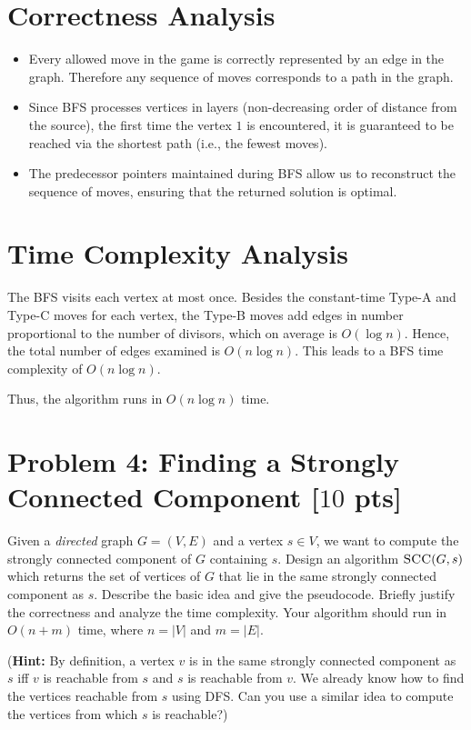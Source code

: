 \documentclass[letterpaper, 11pt]{article}
\newcommand{\1}{\mathds{1}}	%
\theoremstyle{definition}
\newcommand{\problem}[1]{\section*{Problem #1}}
\newenvironment{solution}{{\par\noindent\it Solution.}}{}
\begin{document}
\begin{solution}
\section*{Correctness Analysis}

\begin{itemize}
    \item  Every allowed move in the game is correctly represented by an edge in the graph. Therefore any sequence of moves corresponds to a path in the graph.
    \item  Since BFS processes vertices in layers (non-decreasing order of distance from the source), the first time the vertex \(1\) is encountered, it is guaranteed to be reached via the shortest path (i.e., the fewest moves).
    \item The predecessor pointers maintained during BFS allow us to reconstruct the sequence of moves, ensuring that the returned solution is optimal.
\end{itemize}

\section*{Time Complexity Analysis}

 The BFS visits each vertex at most once. Besides the constant-time Type-A and Type-C moves for each vertex, the Type-B moves add edges in number proportional to the number of divisors, which on average is \(O(\log n)\). Hence, the total number of edges examined is \(O(n \log n)\). This leads to a BFS time complexity of \( O(n \log n) \).


Thus, the algorithm runs in \( O(n \log n) \) time.

\end{solution}
\clearpage

\problem{4: Finding a Strongly Connected Component [$10$ pts]}
Given a \textit{directed} graph $G = (V,E)$ and a vertex $s \in V$, we want to compute the strongly connected component of $G$ containing $s$.
Design an algorithm $\textsc{SCC}(G,s)$ which returns the set of vertices of $G$ that lie in the same strongly connected component as $s$.
Describe the basic idea and give the pseudocode.
Briefly justify the correctness and analyze the time complexity.
Your algorithm should run in $O(n+m)$ time, where $n = |V|$ and $m = |E|$.

(\textbf{Hint:} By definition, a vertex $v$ is in the same strongly connected component as $s$ iff $v$ is reachable from $s$ and $s$ is reachable from $v$. We already know how to find the vertices reachable from $s$ using DFS. Can you use a similar idea to compute the vertices from which $s$ is reachable?)
\end{document}
